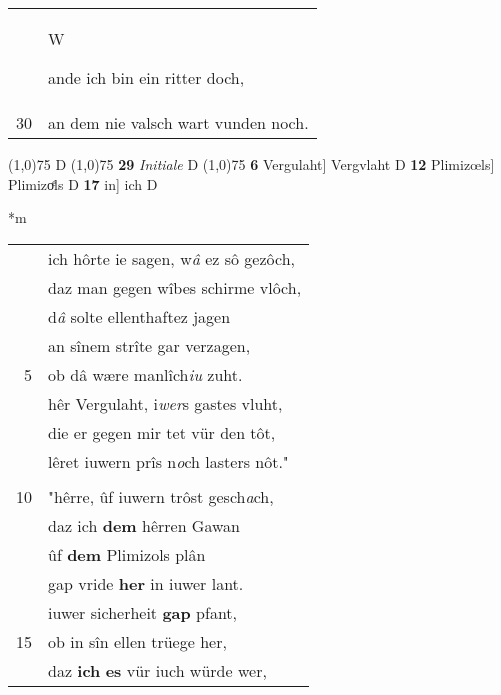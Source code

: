 \documentclass[8pt,a4paper,notitlepage]{article}
\begin{document}
\begin{table}[ht]
\begin{minipage}[t]{0.5\linewidth}
\begin{tabular}{rl}
 & \begin{large}W\end{large}ande ich bin ein ritter doch,\\ 
30 & an dem nie valsch wart vunden noch.\\ 
\end{tabular}
\scriptsize
\line(1,0){75} \newline
D \newline
\line(1,0){75} \newline
\textbf{29} \textit{Initiale} D  \newline
\line(1,0){75} \newline
\textbf{6} Vergulaht] Vergvlaht D \textbf{12} Plimizœls] Plimizoͤls D \textbf{17} in] ich D \newline
\end{minipage}
\hspace{0.5cm}
\begin{minipage}[t]{0.5\linewidth}
\small
\begin{center}*m
\end{center}
\begin{tabular}{rl}
 & ich hôrte ie sagen, w\textit{â} ez sô gezôch,\\ 
 & daz man gegen wîbes schirme vlôch,\\ 
 & d\textit{â} solte ellenthaftez jagen\\ 
 & an sînem strîte gar verzagen,\\ 
5 & ob dâ wære manlîch\textit{iu} zuht.\\ 
 & hêr Vergulaht, i\textit{wer}s gastes vluht,\\ 
 & die er gegen mir tet vür den tôt,\\ 
 & lêret iuwern prîs n\textit{o}ch lasters nôt."\\ 
 & \textit{\begin{large}K\end{large}}in grimursel dô sprach:\\ 
10 & "hêrre, ûf iuwern trôst gesch\textit{a}ch,\\ 
 & daz ich \textbf{dem} hêrren Gawan\\ 
 & ûf \textbf{dem} Plimizols plân\\ 
 & gap vride \textbf{her} in iuwer lant.\\ 
 & iuwer sicherheit \textbf{gap} pfant,\\ 
15 & ob in sîn ellen trüege her,\\ 
 & daz \textbf{ich} \textbf{es} vür iuch würde wer,\\ 

\end{tabular}
\end{minipage}
\end{table}
\end{document}
